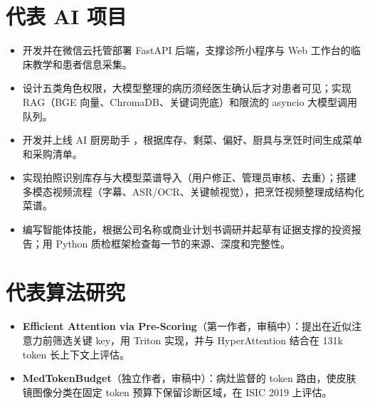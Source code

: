 \documentclass[10pt]{article}
\begin{document}
\section{代表 AI 项目}
\begin{itemize}
\item 开发并在微信云托管部署 FastAPI 后端，支撑诊所小程序与 Web 工作台的临床教学和患者信息采集。
\item 设计五类角色权限，大模型整理的病历须经医生确认后才对患者可见；实现 RAG（BGE 向量、ChromaDB、关键词兜底）和限流的 asyncio 大模型调用队列。
\end{itemize}
\begin{itemize}
\item 开发并上线 AI 厨房助手 ，根据库存、剩菜、偏好、厨具与烹饪时间生成菜单和采购清单。
\item 实现拍照识别库存与大模型菜谱导入（用户修正、管理员审核、去重）；搭建多模态视频流程（字幕、ASR/OCR、关键帧视觉），把烹饪视频整理成结构化菜谱。
\end{itemize}
\begin{itemize}
\item 编写智能体技能，根据公司名称或商业计划书调研并起草有证据支撑的投资报告；用 Python 质检框架检查每一节的来源、深度和完整性。
\end{itemize}

\section{代表算法研究}
\begin{itemize}
\item \textbf{Efficient Attention via Pre-Scoring}（第一作者，审稿中）：提出在近似注意力前筛选关键 key，用 Triton 实现，并与 HyperAttention 结合在 131k token 长上下文上评估。
\item \textbf{MedTokenBudget}（独立作者，审稿中）：病灶监督的 token 路由，使皮肤镜图像分类在固定 token 预算下保留诊断区域，在 ISIC 2019 上评估。
\end{itemize}
\end{document}
